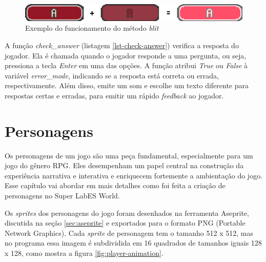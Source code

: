 \begin{figure}[h!]
    \centering
    \includegraphics[width=1\linewidth]{figuras/blit_example.png}
    \caption{Exemplo do funcionamento do método \textit{blit}}
    \label{fig:blit-example}
\end{figure}



A função \textit{check\_answer} (listagem \ref{lst-check-answer}) verifica a resposta do jogador. Ela é chamada quando o jogador responde a uma pergunta, ou seja, pressiona a tecla \textit{Enter} em uma das opções. A função atribui \textit{True} ou \textit{False} à variável \textit{error\_mode}, indicando se a resposta está correta ou errada, respectivamente. Além disso, emite um som e escolhe um texto diferente para respostas certas e erradas, para emitir um rápido \textit{feedback} ao jogador.




\clearpage
\section{Personagens}
\label{sec:personagens}
Os personagens de um jogo são uma peça fundamental, especialmente para um jogo do gênero RPG. Eles desempenham um papel central na construção da experiência narrativa e interativa e enriquecem fortemente a ambientação do jogo. Esse capítulo vai abordar em mais detalhes como foi feita a criação de personagens no Super LabES World.

Os \textit{sprites} dos personagens do jogo foram desenhados na ferramenta Aseprite, discutida na seção \ref{sec:aseprite} e exportados para o formato PNG (Portable Network Graphics). Cada \textit{sprite} de personagem tem o tamanho 512 x 512, mas no programa essa imagem é subdividida em 16 quadrados de tamanhos iguais 128 x 128, como mostra a figura \ref{fig:player-animation}.

